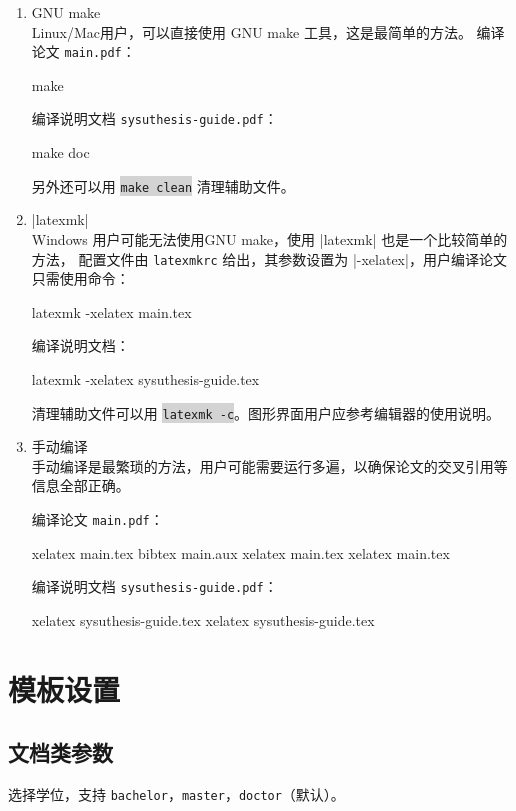 \documentclass[a4paper]{ltxdoc}
\makeatletter
\DeclareRobustCommand\file{\nolinkurl}
\DeclareRobustCommand\opt{\texttt}
\def\DescribeOption{\leavevmode\@bsphack\begingroup\MakePrivateLetters
  \Describe@Option}
\def\Describe@Option#1{\endgroup
              \marginpar{\raggedleft\PrintDescribeOption{#1}}%
              \SpecialEnvIndex{#1}\@esphack\ignorespaces}
\newcommand\shellcmd[1]{\colorbox{lightgray}{\lstinline[style=lstshell]|#1|}}
\makeatother
\begin{document}
\begin{enumerate}

\item GNU make \\
Linux/Mac用户，可以直接使用 GNU make 工具，这是最简单的方法。
编译论文 \file{main.pdf}：
\begin{shell}
  make
\end{shell}
编译说明文档 \file{sysuthesis-guide.pdf}：
\begin{shell}
  make doc
\end{shell}
另外还可以用 \shellcmd{make clean} 清理辅助文件。

\item |latexmk| \\
Windows 用户可能无法使用GNU make，使用 |latexmk| 也是一个比较简单的方法，
配置文件由 \file{latexmkrc} 给出，其参数设置为 |-xelatex|，用户编译论文
只需使用命令：
\begin{shell}
  latexmk -xelatex main.tex
\end{shell}
编译说明文档：
\begin{shell}
  latexmk -xelatex sysuthesis-guide.tex
\end{shell}
清理辅助文件可以用 \shellcmd{latexmk -c}。图形界面用户应参考编辑器的使用说明。

\item 手动编译 \\
手动编译是最繁琐的方法，用户可能需要运行多遍，以确保论文的交叉引用等信息全部正确。

编译论文 \file{main.pdf}：
\begin{shell}
  xelatex main.tex
  bibtex main.aux
  xelatex main.tex
  xelatex main.tex
\end{shell}
编译说明文档 \file{sysuthesis-guide.pdf}：
\begin{shell}
  xelatex sysuthesis-guide.tex
  xelatex sysuthesis-guide.tex
\end{shell}
\end{enumerate}



\section{模板设置}


\subsection{文档类参数}
\DescribeOption{degree}
选择学位，支持 \opt{bachelor}，\opt{master}，\opt{doctor}（默认）。
\end{document}
